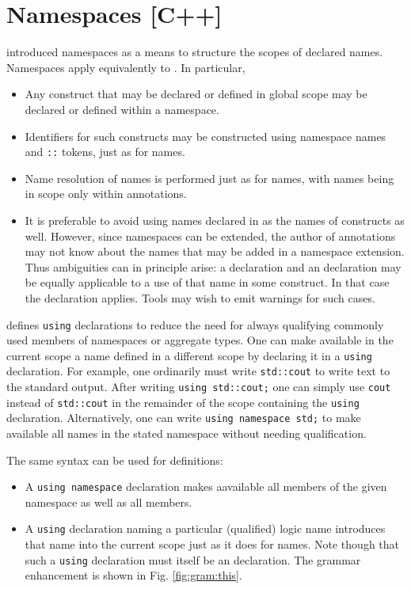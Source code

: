 \section{Namespaces [C++]}
\label{sec:namespaces}

\lang introduced namespaces as a means to structure the scopes of declared names. Namespaces apply equivalently to \NAME. In particular,
\begin{itemize}
\item Any \NAME construct that may be declared or defined 
in global scope may be declared or defined within a namespace.
\item Identifiers for such constructs may be constructed using namespace names and \lstinline|::| tokens, just as for \lang names.
\item Name resolution of \NAME names is performed just as for \lang names, with \NAME names being in scope only within \NAME annotations.
\item It is preferable to avoid using names declared in \lang as the names of \NAME constructs as well. However, since namespaces can be extended, the author of \NAME annotations may not know about the \lang names that may be added in a namespace extension. Thus ambiguities can in
principle arise: a \lang declaration and an \NAME
declaration may be equally applicable to a use of that name 
in some \NAME construct. In that case the \lang declaration applies.
Tools may wish to emit warnings for such cases.

\end{itemize}

\lang defines \lstinline|using| declarations to reduce the need for always qualifying commonly used members of namespaces or aggregate types.
One can make available in the current scope a name defined in a different scope by declaring it in a \lstinline|using| declaration. For example,
one ordinarily must write \lstinline|std::cout| to write text to the standard output. After writing \lstinline|using std::cout;| one can simply use \lstinline|cout| instead of \lstinline|std::cout| in the remainder of the scope containing the \lstinline|using| declaration.
Alternatively, one can write \lstinline|using namespace std;| to make available all names in the stated namespace without needing qualification.

The same syntax can be used for \NAME definitions:
\begin{itemize}
	\item A \lang \lstinline|using namespace| declaration makes aavailable all \NAME members of the given namespace as well as all \lang members.
	\item A \lstinline|using| declaration naming a particular (qualified) logic name introduces that name into the current scope just as it does for \lang names. Note though that such a \lstinline|using| declaration must itself be an \NAME declaration. The grammar enhancement is shown in Fig. \ref{fig:gram:this}.
\end{itemize}

